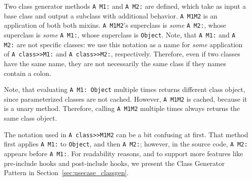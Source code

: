 Two class generator methods \texttt{A M1:} and \texttt{A M2:} are defined, which take as input a base class and output a subclass with additional behavior. \texttt{A M1M2} is an application of both both mixins. \texttt{A M1M2}'s superclass is \emph{some} \texttt{A M2:}, whose superclass is \emph{some} \texttt{A M1:}, whose superclass is \texttt{Object}. Note, that \texttt{A M1:} and \texttt{A M2:} are not specific classes: we use this notation as a name for \emph{some} application of \texttt{A class>>M1:} and \texttt{A class>>M2:}, respectively. Therefore, even if two classes have the same name, they are not necessarily the same class if they names contain a colon.

Note, that evaluating \texttt{A M1: Object} multiple times returns different class object, since parameterized classes are not cached. However, \texttt{A M1M2} is cached, because it is a unary method. Therefore, calling \texttt{A M1M2} multiple times always returns the same class object.

The notation used in \texttt{A class>>M1M2} can be a bit confusing at first. That method first applies \texttt{A M1:} to \texttt{Object}, and then \texttt{A M2:}; however, in the source code, \texttt{A M2:} appears before \texttt{A M1:}. For readability reasons, and to support more features like pre-include hooks and post-include hooks, we present the Class Generator Pattern in Section~\ref{sec:usecase_classgen}.
